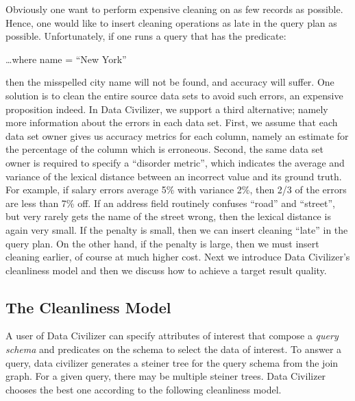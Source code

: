Obviously one want to perform expensive cleaning on as few records as possible.
Hence, one would like to insert cleaning operations as late in the query plan as
possible. Unfortunately, if one runs a query that has the predicate:

…where name = “New York”

then the misspelled city name will not be found, and accuracy will suffer. One
solution is to clean the entire source data sets to avoid such errors, an
expensive proposition indeed. In Data Civilizer, we support a third alternative;
namely more information about the errors in each data set. First, we assume that
each data set owner gives us accuracy metrics for each column, namely an
estimate for the percentage of the column which is erroneous.  Second, the same
data set owner is required to specify a “disorder metric”, which indicates the
average and variance of the lexical distance between an incorrect value and its
ground truth. For example, if salary errors average 5\% with variance 2\%, then
2/3 of the errors are less than 7\% off. If an address field routinely confuses
“road” and “street”, but very rarely gets the name of the street wrong, then the
lexical distance is again very small. If the penalty is small, then we can
insert cleaning “late” in the query plan. On the other hand, if the penalty is
large, then we must insert cleaning earlier, of course at much higher cost. Next
we introduce Data Civilizer's cleanliness model and then we discuss how to
achieve a target result quality.



\subsection{The Cleanliness Model}
\label{subsec:model:recall}

A user of Data Civilizer can specify attributes of interest that compose a
\emph{query schema} and predicates on the schema to select the data of interest.
To answer a query, data civilizer generates a steiner tree for the query schema
from the join graph. For a given query, there may be multiple steiner trees.
Data Civilizer chooses the best one according to the following cleanliness
model.

